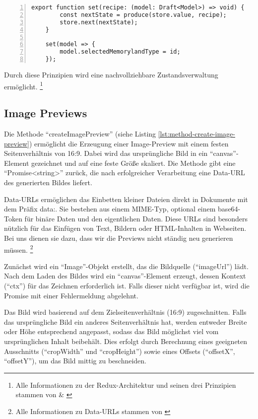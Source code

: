\begin{lstlisting}[numbers=left,caption={State ist unveränderlich Implementierung in Memoryland},label={lst:state-management}]
    export function set(recipe: (model: Draft<Model>) => void) {
        const nextState = produce(store.value, recipe);
        store.next(nextState);
    }

    set(model => {
        model.selectedMemorylandType = id;
    });
\end{lstlisting}

Durch diese Prinzipien wird eine nachvollziehbare Zustandsverwaltung ermöglicht.
\footnote{Alle Informationen zu der Redux-Architektur und seinen drei Prinzipien stammen von \cite{DAR} \& \cite{DARa}}

\subsection{Image Previews}
Die Methode ``createImagePreview'' (siehe Listing \ref{lst:method-create-image-preview}) ermöglicht die Erzeugung 
einer Image-Preview mit einem festen Seitenverhältnis von 16:9. Dabei wird das ursprüngliche Bild in ein 
``canvas''-Element gezeichnet und auf eine feste Größe skaliert. Die Methode gibt eine ``Promise<string>'' zurück, 
die nach erfolgreicher Verarbeitung eine Data-URL des generierten Bildes liefert.

Data-URLs ermöglichen das Einbetten kleiner Dateien direkt in Dokumente mit dem Präfix data:. Sie bestehen 
aus einem MIME-Typ, optional einem base64-Token für binäre Daten und den eigentlichen Daten. Diese URLs sind 
besonders nützlich für das Einfügen von Text, Bildern oder HTML-Inhalten in Webseiten. Bei uns dienen sie dazu,
dass wir die Previews nicht ständig neu generieren müssen. 
\footnote{Alle Informationen zu Data-URLs stammen von \cite{MozillaFoundationa}}

Zunächst wird ein ``Image''-Objekt erstellt, das die Bildquelle (``imageUrl'') lädt. Nach dem Laden des Bildes wird ein 
``canvas''-Element erzeugt, dessen Kontext (``ctx'') für das Zeichnen erforderlich ist. Falls dieser nicht verfügbar 
ist, wird die Promise mit einer Fehlermeldung abgelehnt.

Das Bild wird basierend auf dem Zielseitenverhältnis (16:9) zugeschnitten. Falls das ursprüngliche Bild ein anderes 
Seitenverhältnis hat, werden entweder Breite oder Höhe entsprechend angepasst, sodass das Bild möglichst viel vom 
ursprünglichen Inhalt beibehält. Dies erfolgt durch Berechnung eines geeigneten Ausschnitts (``cropWidth'' und ``cropHeight'') 
sowie eines Offsets (``offsetX'', ``offsetY''), um das Bild mittig zu beschneiden.

